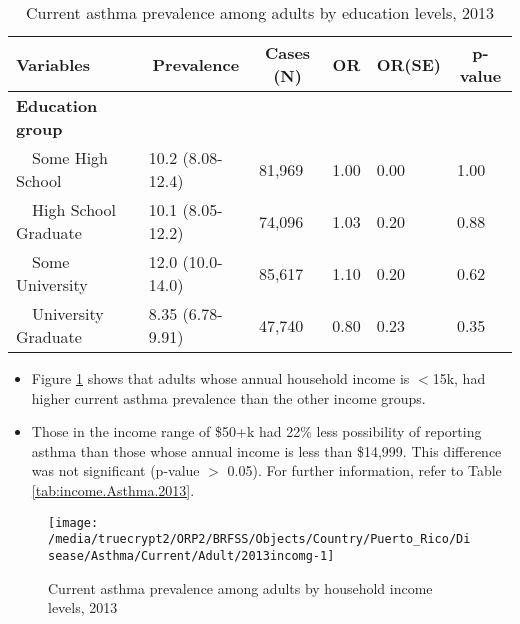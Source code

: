 \begin{table}[H]
\caption{Current asthma prevalence  among adults by education levels, 2013\label{tab:edu.Asthma.2013}} 
\begin{center}
\begin{tabular}{llllll}
\hline\hline
\multicolumn{1}{l}{Variables}&\multicolumn{1}{c}{Prevalence}&\multicolumn{1}{c}{Cases (N)}&\multicolumn{1}{c}{OR}&\multicolumn{1}{c}{OR(SE)}&\multicolumn{1}{c}{p-value}\tabularnewline
\hline
{\bfseries Education group}&&&&&\tabularnewline
~~Some High School&10.2 (8.08-12.4)&81,969&1.00&0.00&1.00\tabularnewline
~~High School Graduate&10.1 (8.05-12.2)&74,096&1.03&0.20&0.88\tabularnewline
~~Some University&12.0 (10.0-14.0)&85,617&1.10&0.20&0.62\tabularnewline
~~University Graduate&8.35 (6.78-9.91)&47,740&0.80&0.23&0.35\tabularnewline
\hline
\end{tabular}\end{center}

\end{table}

 
 
 \newpage
\begin{itemize}

\item Figure \ref{fig:income.Asthma.2013} shows that adults whose annual household income is 
$<$15k, had higher current asthma prevalence than the other income groups.

\item Those in the income range of \$50+k had 22\% less possibility of reporting asthma than those whose annual income is less than \$14,999. This difference was not significant (p-value $>$ 0.05).  For further information, refer to Table \ref{tab:income.Asthma.2013}.

\end{itemize}

\begin{figure}[H]
\caption{Current asthma prevalence among adults by household income levels, 
         2013}
\begin{knitrout}
\color{fgcolor}

{\centering \texttt{[image: /media/truecrypt2/ORP2/BRFSS/Objects/Country/Puerto\_Rico/Disease/Asthma/Current/Adult/2013incomg-1]} 

}



\end{knitrout}
 \label{fig:income.Asthma.2013}
\end{figure}

